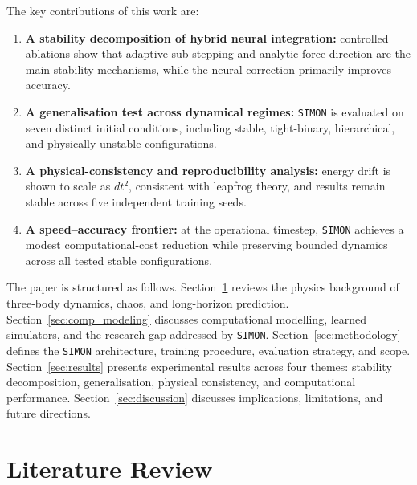 \documentclass[12pt]{article}
\begin{document}
The key contributions of this work are:
\begin{enumerate}
    \item \textbf{A stability decomposition of hybrid neural integration:} controlled ablations show that adaptive sub-stepping and analytic force direction are the main stability mechanisms, while the neural correction primarily improves accuracy.

    \item \textbf{A generalisation test across dynamical regimes:} \texttt{SIMON} is evaluated on seven distinct initial conditions, including stable, tight-binary, hierarchical, and physically unstable configurations.

    \item \textbf{A physical-consistency and reproducibility analysis:} energy drift is shown to scale as $dt^2$, consistent with leapfrog theory, and results remain stable across five independent training seeds.

    \item \textbf{A speed--accuracy frontier:} at the operational timestep, \texttt{SIMON} achieves a modest computational-cost reduction while preserving bounded dynamics across all tested stable configurations.
\end{enumerate}

The paper is structured as follows.
Section~\ref{sec:lit_review} reviews the physics background of three-body dynamics,
chaos, and long-horizon prediction.
Section~\ref{sec:comp_modeling} discusses computational modelling, learned simulators,
and the research gap addressed by \texttt{SIMON}.
Section~\ref{sec:methodology} defines the \texttt{SIMON} architecture, training procedure,
evaluation strategy, and scope.
Section~\ref{sec:results} presents experimental results across four themes:
stability decomposition, generalisation, physical consistency, and computational
performance.
Section~\ref{sec:discussion} discusses implications, limitations, and future
directions.

\section{Literature Review}
\label{sec:lit_review}
\end{document}
